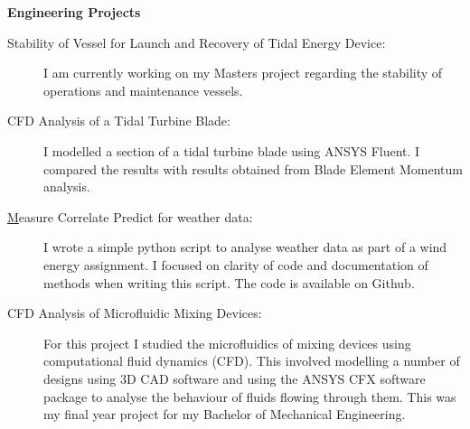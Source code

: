 \documentclass[letterpaper,11pt]{article}
\newcommand{\resheading}[1]{{\large \colorbox{mygrey}{\begin{minipage}{\textwidth}{\textbf{#1 \vphantom{p\^{E}}}}\end{minipage}}}}
\begin{document}
\resheading{Engineering Projects}

\begin{description}
\item[Stability of Vessel for Launch and Recovery of Tidal Energy Device:] {I am currently working on my Masters project regarding the stability of operations and maintenance vessels.}
\item[CFD Analysis of a Tidal Turbine Blade:] {I modelled a section of a tidal turbine blade using ANSYS Fluent. I compared the results with results obtained from Blade Element Momentum analysis.}

\item[{\href{https://github.com/peteretep/measure-correlate-predict}Measure Correlate Predict for weather data}:] { I wrote a simple python script to analyse weather data as part of a wind energy assignment. I focused on clarity of code and documentation of methods when writing this script. The code is available on Github.}

\item[CFD Analysis of Microfluidic Mixing Devices:] { For this project I studied the microfluidics of mixing devices using computational fluid dynamics (CFD). This involved modelling a number of designs using 3D CAD software and using the ANSYS CFX software package to analyse the behaviour of fluids flowing through them. This was my final year project for my Bachelor of Mechanical Engineering. }

\end{description}
\end{document}

